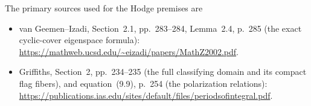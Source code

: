 The primary sources used for the Hodge premises are
\begin{itemize}
\item van Geemen--Izadi, Section~2.1, pp.~283--284,
Lemma~2.4, p.~285 (the exact cyclic-cover eigenspace formula):
\url{https://mathweb.ucsd.edu/~eizadi/papers/MathZ2002.pdf}.
\item Griffiths, Section~2, pp.~234--235 (the full classifying
domain and its compact flag fibers), and equation~(9.9),
p.~254 (the polarization relations):
\url{https://publications.ias.edu/sites/default/files/periodsofintegral.pdf}.
\end{itemize}
